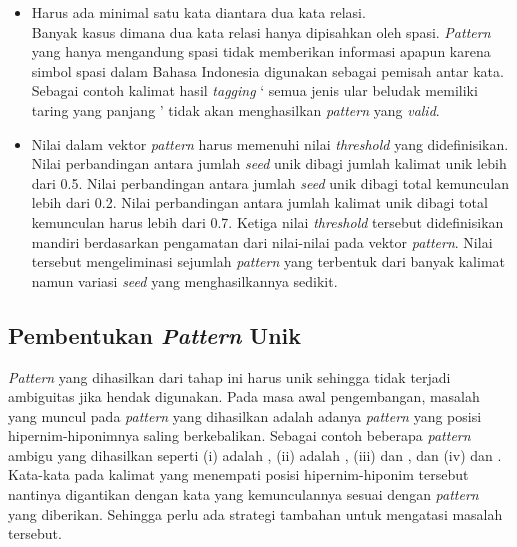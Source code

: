 \begin{itemize}
  \item Harus ada minimal satu kata diantara dua kata relasi. \\
  Banyak kasus dimana dua kata relasi hanya dipisahkan oleh spasi. \textit{Pattern} yang hanya mengandung spasi tidak memberikan informasi apapun karena simbol spasi dalam Bahasa Indonesia digunakan sebagai pemisah antar kata. Sebagai contoh kalimat hasil \textit{tagging} `{\tagStart} semua jenis {\tagHypernym}ular{\tagHypernym} {\tagHyponym}beludak{\tagHyponym} memiliki taring yang panjang {\tagEnd}' tidak akan menghasilkan \textit{pattern} yang \textit{valid}.
  \item Nilai dalam vektor \textit{pattern} harus memenuhi nilai \textit{threshold} yang didefinisikan. \\
  Nilai perbandingan antara jumlah \textit{seed} unik dibagi jumlah kalimat unik lebih dari 0.5. Nilai perbandingan antara jumlah \textit{seed} unik dibagi total kemunculan lebih dari 0.2. Nilai perbandingan antara jumlah kalimat unik dibagi total kemunculan harus lebih dari 0.7. Ketiga nilai \textit{threshold} tersebut didefinisikan mandiri berdasarkan pengamatan dari nilai-nilai pada vektor \textit{pattern}. Nilai tersebut mengeliminasi sejumlah \textit{pattern} yang terbentuk dari banyak kalimat namun variasi \textit{seed} yang menghasilkannya sedikit.
\end{itemize}

\subsection{Pembentukan \textit{Pattern} Unik}
\textit{Pattern} yang dihasilkan dari tahap ini harus unik sehingga tidak terjadi ambiguitas jika hendak digunakan. Pada masa awal pengembangan, masalah yang muncul pada \textit{pattern} yang dihasilkan adalah adanya \textit{pattern} yang posisi hipernim-hiponimnya saling berkebalikan. Sebagai contoh beberapa \textit{pattern} ambigu yang dihasilkan seperti (i) {\tagHyponym} adalah {\tagHypernym}, (ii) {\tagHypernym} adalah {\tagHyponym}, (iii) {\tagHypernym} dan {\tagHyponym}, dan (iv) {\tagHyponym} dan {\tagHypernym}. Kata-kata pada kalimat yang menempati posisi hipernim-hiponim tersebut nantinya digantikan dengan kata yang kemunculannya sesuai dengan \textit{pattern} yang diberikan. Sehingga perlu ada strategi tambahan untuk mengatasi masalah tersebut.

